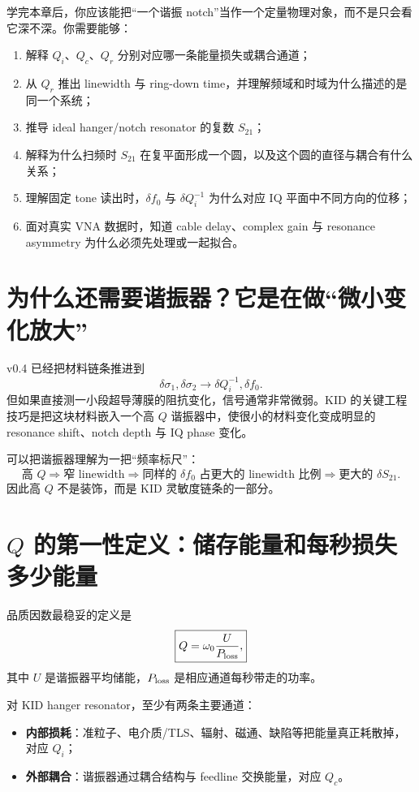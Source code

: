 \documentclass[11pt,a4paper,openany]{ctexrep}
\begin{document}
\begin{goalbox}
学完本章后，你应该能把“一个谐振 notch”当作一个定量物理对象，而不是只会看它深不深。你需要能够：
\begin{enumerate}
  \item 解释 $Q_i$、$Q_c$、$Q_r$ 分别对应哪一条能量损失或耦合通道；
  \item 从 $Q_r$ 推出 linewidth 与 ring-down time，并理解频域和时域为什么描述的是同一个系统；
  \item 推导 ideal hanger/notch resonator 的复数 $S_{21}$；
  \item 解释为什么扫频时 $S_{21}$ 在复平面形成一个圆，以及这个圆的直径与耦合有什么关系；
  \item 理解固定 tone 读出时，$\delta f_0$ 与 $\delta Q_i^{-1}$ 为什么对应 IQ 平面中不同方向的位移；
  \item 面对真实 VNA 数据时，知道 cable delay、complex gain 与 resonance asymmetry 为什么必须先处理或一起拟合。
\end{enumerate}
\end{goalbox}

\section{为什么还需要谐振器？它是在做“微小变化放大”}

v0.4 已经把材料链条推进到
\[
\delta\sigma_1,\delta\sigma_2
\rightarrow
\delta Q_i^{-1},\delta f_0.
\]
但如果直接测一小段超导薄膜的阻抗变化，信号通常非常微弱。KID 的关键工程技巧是把这块材料嵌入一个高 $Q$ 谐振器中，使很小的材料变化变成明显的 resonance shift、notch depth 与 IQ phase 变化。

可以把谐振器理解为一把“频率标尺”：
\[
\boxed{
\text{高 }Q
\Rightarrow
\text{窄 linewidth}
\Rightarrow
\text{同样的 }\delta f_0\text{ 占更大的 linewidth 比例}
\Rightarrow
\text{更大的 }\delta S_{21}.
}
\]
因此高 $Q$ 不是装饰，而是 KID 灵敏度链条的一部分。

\section{$Q$ 的第一性定义：储存能量和每秒损失多少能量}

品质因数最稳妥的定义是
\[
\boxed{
Q=\omega_0\frac{U}{P_{\rm loss}},
}
\]
其中 $U$ 是谐振器平均储能，$P_{\rm loss}$ 是相应通道每秒带走的功率。

对 KID hanger resonator，至少有两条主要通道：
\begin{itemize}
  \item \textbf{内部损耗}：准粒子、电介质/TLS、辐射、磁通、缺陷等把能量真正耗散掉，对应 $Q_i$；
  \item \textbf{外部耦合}：谐振器通过耦合结构与 feedline 交换能量，对应 $Q_c$。
\end{itemize}
\end{document}

